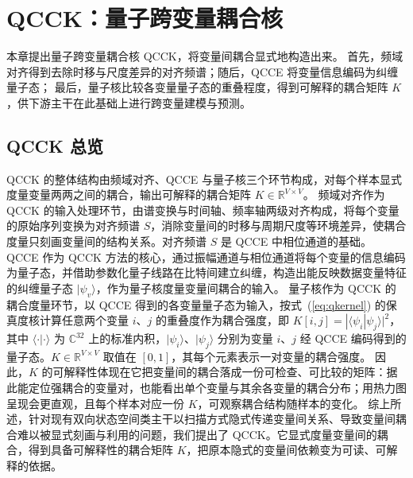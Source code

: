 


\section{QCCK：量子跨变量耦合核}

本章提出量子跨变量耦合核 QCCK，将变量间耦合显式地构造出来。
首先，频域对齐得到去除时移与尺度差异的对齐频谱；随后，QCCE 将变量信息编码为纠缠量子态；
最后，量子核比较各变量量子态的重叠程度，得到可解释的耦合矩阵 $K$，供下游主干在此基础上进行跨变量建模与预测。

\subsection{QCCK 总览}

QCCK 的整体结构由频域对齐、QCCE 与量子核三个环节构成，对每个样本显式度量变量两两之间的耦合，输出可解释的耦合矩阵 $K\in\mathbb{R}^{V\times V}$。
频域对齐作为 QCCK 的输入处理环节，由谱变换与时间轴、频率轴两级对齐构成，将每个变量的原始序列变换为对齐频谱 $S$，消除变量间的时移与周期尺度等环境差异，使耦合度量只刻画变量间的结构关系。对齐频谱 $S$ 是 QCCE 中相位通道的基础。
QCCE 作为 QCCK 方法的核心，通过振幅通道与相位通道将每个变量的信息编码为量子态，并借助参数化量子线路在比特间建立纠缠，构造出能反映数据变量特征的纠缠量子态 $|\psi_v\rangle$，作为量子核度量变量间耦合的输入。
量子核作为 QCCK 的耦合度量环节，以 QCCE 得到的各变量量子态为输入，按式~(\ref{eq:qkernel}) 的保真度核计算任意两个变量 $i$、$j$ 的重叠度作为耦合强度，即 $K[i,j] = |\langle\psi_i|\psi_j\rangle|^2$，其中 $\langle\cdot|\cdot\rangle$ 为 $\mathbb{C}^{32}$ 上的标准内积，$|\psi_i\rangle$、$|\psi_j\rangle$ 分别为变量 $i$、$j$ 经 QCCE 编码得到的量子态。$K\in\mathbb{R}^{V\times V}$ 取值在 $[0,1]$，其每个元素表示一对变量的耦合强度。
因此，$K$ 的可解释性体现在它把变量间的耦合落成一份可检查、可比较的矩阵：据此能定位强耦合的变量对，也能看出单个变量与其余各变量的耦合分布；用热力图呈现会更直观，且每个样本对应一份 $K$，可观察耦合结构随样本的变化。
综上所述，针对现有双向状态空间类主干以扫描方式隐式传递变量间关系、导致变量间耦合难以被显式刻画与利用的问题，我们提出了 QCCK。它显式度量变量间的耦合，得到具备可解释性的耦合矩阵 $K$，把原本隐式的变量间依赖变为可读、可解释的依据。

